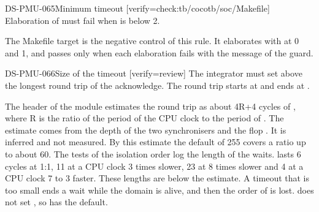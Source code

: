 \begin{requirement}{DS-PMU-065}{Minimum timeout}
[verify={check:tb/cocotb/soc/Makefile}]
Elaboration of  must fail when  is below 2.
\end{requirement}
\begin{information}
The Makefile target  is the negative control of this rule. It elaborates  with  at 0 and 1, and passes only when each elaboration fails with the message of the guard.
\end{information}

\begin{requirement}{DS-PMU-066}{Size of the timeout}
[verify={review}]
The integrator must set  above the longest round trip of the acknowledge. The round trip starts at  and ends at .
\end{requirement}
\begin{information}
The header of the module estimates the round trip as about 4R+4 cycles of , where R is the ratio of the period of the CPU clock to the period of . The estimate comes from the depth of the two synchronisers and the flop . It is inferred and not measured. By this estimate the default of 255 covers a ratio up to about 60. The tests of the isolation order log the length of the waits.  lasts 6 cycles at 1:1, 11 at a CPU clock 3 times slower, 23 at 8 times slower and 4 at a CPU clock 7 to 3 faster. These lengths are below the estimate. A timeout that is too small ends a wait while the domain is alive, and then the order of  is lost.  does not set , so  has the default.
\end{information}

